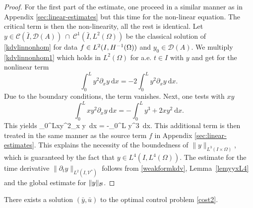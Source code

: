 \begin{proof}
For the first part of the estimate, one proceed in a similar manner as in Appendix \ref{sec:linear-estimates} but this time for the non-linear \KdV equation. The critical term is then the non-linearity, all the rest is identical. Let $y\in \mathcal C(\bar I,\mathcal D(A))~\cap~\mathcal C^1(\bar I,L^2(\Omega))$ be the classical solution of \eqref{kdvlinnonhom} for data $f\in \Hm1$ and $y_0\in \mathcal D(A)$. We multiply \eqref{kdvlinnonhom1} which holds in $L^2(\Omega)$ for a.e. $t\in I$ with $y$ and get for the nonlinear term
\[
\int_0^Ly^2\partial_xy~\mathrm dx=-2\int_0^Ly^2\partial_xy~\mathrm dx.
\]
Due to the boundary conditions, the term vanishes. Next, one tests with $xy$
\[
\int_0^Lxy^2\partial_x y~\mathrm dx = -\int_0^L y^3+2xy^2~\mathrm dx.
\]
This yields
\be
\nonumber
\int_0^Lxy^2\partial_x y~\mathrm dx = -\int_0^L y^3~\mathrm dx.
\ee
This additional term is then treated in the same manner as the source term $f$ in Appendix \ref{sec:linear-estimates}. This explains the necessity of the boundedness of $\|y\|_{L^3(I\times\Omega)}$, which is guaranteed by the fact that $y \in L^4(I,L^4(\Omega))$. The estimate for the time derivative $\|\partial_{t}y\|_{L^2(I,\mathcal{V}^{*})}$ follows from \eqref{weakformkdv}, Lemma~\ref{lemyyxL4} and the global estimate for $\lVert y\rVert_{\mathcal{B}}$.
\end{proof}

\begin{prop}
 There exists a solution $(\bar y, \bar u)$ to the optimal control problem \eqref{cost2}.
\end{prop}

